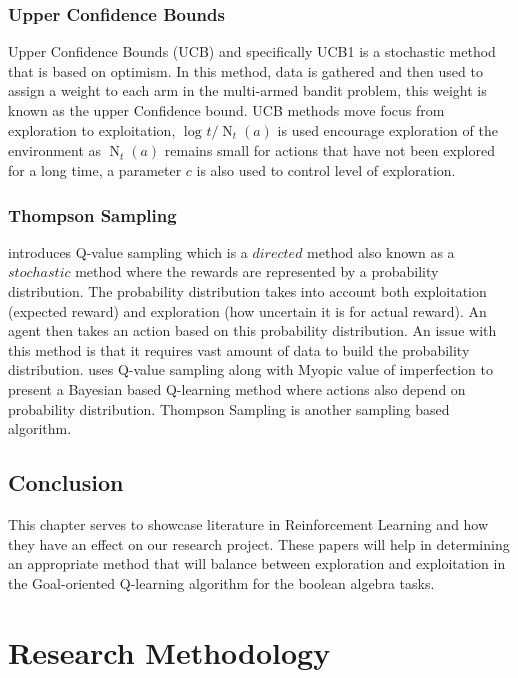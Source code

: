 \documentclass[a4paper,twoside,12pt]{report}
\begin{document}
\subsection{Upper Confidence Bounds}
Upper Confidence Bounds (UCB) and specifically UCB1 \citep*{auer2002finite} is a stochastic method that is based on 
optimism. In this method, data is gathered and then used to assign a weight to each arm in the multi-armed bandit 
problem, this weight is known as the upper Confidence bound. UCB methods move focus from exploration to exploitation, 
$\log_{}{t} / \operatorname{N}_t(a)$ is used encourage exploration of the environment as $\operatorname{N}_t(a)$ remains
small for actions that have not been explored for a long time, a parameter $c$ is also used to control level of 
exploration.

\subsection{Thompson Sampling}
\citet*{wyatt1998exploration} introduces Q-value sampling which is a $directed$ method also known as a $stochastic$
method where the rewards are represented by a probability distribution. The probability distribution takes into account 
both exploitation (expected reward) and exploration (how uncertain it is for actual reward). An agent then takes an 
action based on this probability distribution. An issue with this method is that it requires vast amount of data to 
build the probability distribution. \citet*{dearden1998bayesian} uses Q-value sampling along with Myopic value of 
imperfection \citet*{howard1966information} to present a Bayesian based Q-learning method where actions also depend on 
probability distribution. Thompson Sampling \citep*{thompson1933likelihood} is another sampling based algorithm.

\section{Conclusion} \label{review:conclusion}
This chapter serves to showcase literature in Reinforcement Learning and how they have an effect on our research project.
These papers will help in determining an appropriate method that will balance between exploration and exploitation in 
the Goal-oriented Q-learning algorithm for the boolean algebra tasks.


\chapter{Research Methodology} \label{ch:researchMethodology}
\end{document}
